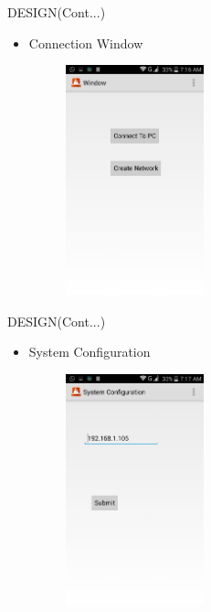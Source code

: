  \begin{frame}{DESIGN(Cont...)}  
   \begin{itemize}
  	\item Connection Window 
 	 \begin{figure}[ht!]
     \centering
    \includegraphics[width=4cm]{window.png}
    \label{fig:pc control home}
\end{figure}
   \end{itemize}
 \end{frame} 
 
 \begin{frame}{DESIGN(Cont...)}  
   \begin{itemize}
  	\item System Configuration
 	 \begin{figure}[ht!]
     \centering
    \includegraphics[width=4cm]{system.png}
    \label{fig:pc control desktop}
\end{figure}
   \end{itemize}
 \end{frame} 
 

